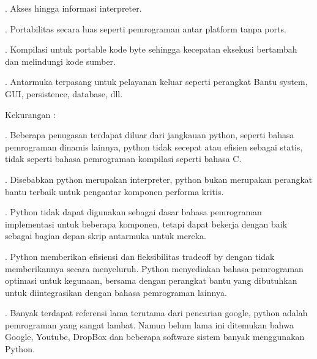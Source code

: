 {{{{{{{{{\noindent 
{\fontsize{14pt}{14pt}. Akses hingga informasi interpreter. \\} \par
\noindent 
{\fontsize{14pt}{14pt}. Portabilitas secara luas seperti pemrograman antar platform tanpa ports. \\} \par
\noindent 
{\fontsize{14pt}{14pt}. Kompilasi untuk portable kode byte sehingga kecepatan eksekusi bertambah dan melindungi kode sumber. \\} \par
\noindent 
{\fontsize{14pt}{14pt}. Antarmuka terpasang untuk pelayanan keluar seperti perangkat Bantu system, GUI, persistence, database, dll. \\} \par
\vspace{14pt}
\noindent 
{\fontsize{14pt}{14pt}\selectfont Kekurangan : \\} \par
\vspace{14pt}
\noindent 
{\fontsize{14pt}{14pt}. Beberapa penugasan terdapat diluar dari jangkauan python, seperti bahasa pemrograman dinamis lainnya, python tidak secepat atau efisien sebagai statis, tidak seperti bahasa pemrograman kompilasi seperti bahasa C. \\} \par
\noindent 
{\fontsize{14pt}{14pt}. Disebabkan python merupakan interpreter, python bukan merupakan perangkat bantu terbaik untuk pengantar komponen performa kritis. \\} \par
\noindent 
{\fontsize{14pt}{14pt}. Python tidak dapat digunakan sebagai dasar bahasa pemrograman implementasi untuk beberapa komponen, tetapi dapat bekerja dengan baik sebagai bagian depan skrip antarmuka untuk mereka. \\} \par
\noindent 
{\fontsize{14pt}{14pt}. Python memberikan efisiensi dan fleksibilitas tradeoff by dengan tidak memberikannya secara menyeluruh. Python menyediakan bahasa pemrograman optimasi untuk kegunaan, bersama dengan perangkat bantu yang dibutuhkan untuk diintegrasikan dengan bahasa pemrograman lainnya. \\} \par
\noindent 
{\fontsize{14pt}{14pt}. Banyak terdapat referensi lama terutama dari pencarian google, python adalah pemrograman yang sangat lambat. Namun belum lama ini ditemukan bahwa Google, Youtube, DropBox dan beberapa software sistem banyak menggunakan Python. \\} \par
}}}}}}}}}
